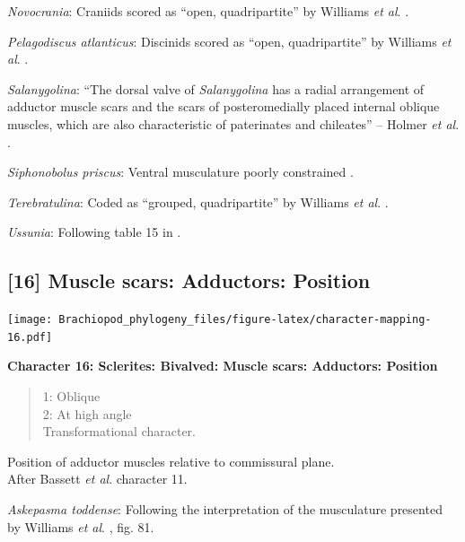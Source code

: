 \documentclass[openany]{book}
\theoremstyle{definition}
\theoremstyle{definition}
\theoremstyle{definition}
\theoremstyle{remark}
\begin{document}
\hypertarget{Novocrania-coding-15}{}
\emph{Novocrania}: Craniids scored as ``open, quadripartite'' by
Williams \emph{et al}. \citeyearpar{Williams1996Asupra}.

\hypertarget{Pelagodiscus_atlanticus-coding-15}{}
\emph{Pelagodiscus atlanticus}: Discinids scored as ``open,
quadripartite'' by Williams \emph{et al}.
\citeyearpar{Williams1996Asupra}.

\hypertarget{Salanygolina-coding-15}{}
\emph{Salanygolina}: ``The dorsal valve of \emph{Salanygolina} has a
radial arrangement of adductor muscle scars and the scars of
posteromedially placed internal oblique muscles, which are also
characteristic of paterinates and chileates'' -- Holmer \emph{et al}.
\citeyearpar{Holmer2009Theenigmatic}.

\hypertarget{Siphonobolus_priscus-coding-15}{}
\emph{Siphonobolus priscus}: Ventral musculature poorly constrained
\citep{Williams2000LinguliformeaCraniiformea, Popov2009Earlyontogeny}.

\hypertarget{Terebratulina-coding-15}{}
\emph{Terebratulina}: Coded as ``grouped, quadripartite'' by Williams
\emph{et al}. \citeyearpar{Williams1996Asupra}.

\hypertarget{Ussunia-coding-15}{}
\emph{Ussunia}: Following table 15 in
\citet{Williams2000LinguliformeaCraniiformea}.

\subsection*{{[}16{]} Muscle scars: Adductors:
Position}\label{muscle-scars-adductors-position}

\texttt{[image: Brachiopod\_phylogeny\_files/figure-latex/character-mapping-16.pdf]}

\textbf{Character 16: Sclerites: Bivalved: Muscle scars: Adductors:
Position}

\begin{quote}
1: Oblique\\
2: At high angle\\
Transformational character.
\end{quote}

Position of adductor muscles relative to commissural plane.\\
After Bassett \emph{et al}.
\citeyearpar{Bassett2001Functionalmorphology} character 11.

\hypertarget{Askepasma_toddense-coding-16}{}
\emph{Askepasma toddense}: Following the interpretation of the
musculature presented by Williams \emph{et al}.
\citeyearpar{Williams2000LinguliformeaCraniiformea}, fig. 81.
\end{document}
